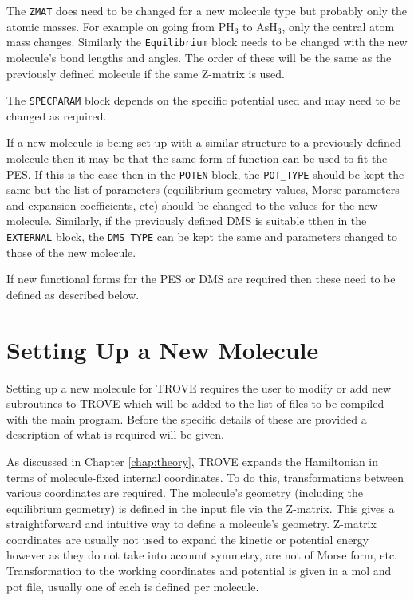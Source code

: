 The \verb|ZMAT| does need to be changed for a new molecule type but probably only the atomic masses. For example
on going from PH$_3$ to AsH$_3$, only the central atom mass changes. Similarly the \verb|Equilibrium| block needs to 
be changed with the new molecule's bond lengths and angles. The order of these will be the same as the 
previously defined molecule if the same Z-matrix is used.

The \verb|SPECPARAM| block depends on the specific potential used and may need to be changed as required. 

If a new molecule is being set up with a similar structure to a previously defined molecule then it may be that the 
same form of function can be used to fit the PES. If this is the case then in the \verb|POTEN| block, the 
\verb|POT_TYPE| should be kept the same but the list of parameters (equilibrium geometry values, Morse parameters and
expansion coefficients, etc) should be changed to the values for the new molecule. Similarly, if the previously defined
DMS is suitable tthen in the \verb|EXTERNAL| block, the \verb|DMS_TYPE| can be kept the same and parameters changed to those
of the new molecule. 

If new functional forms for the PES or DMS are required then these need to be defined as described below.


\section{Setting Up a New Molecule}

Setting up a new molecule for TROVE requires the user to modify or add new subroutines to TROVE which will be added to the
list of files to be compiled with the main program. Before the specific details of these are provided a description 
of what is required will be given.

As discussed in Chapter \ref{chap:theory}, TROVE expands the Hamiltonian in terms of molecule-fixed internal coordinates.
To do this, transformations between various coordinates are required. The molecule's geometry (including the equilibrium
geometry) is defined in the input file via the Z-matrix. This gives a straightforward and intuitive 
way to define a molecule's geometry. Z-matrix coordinates are usually not used to expand the kinetic or potential
energy however as they do not take into account symmetry, are not of Morse form, etc. Transformation to the working coordinates
and potential is given in a mol and pot file, usually one of each is defined per molecule. 

